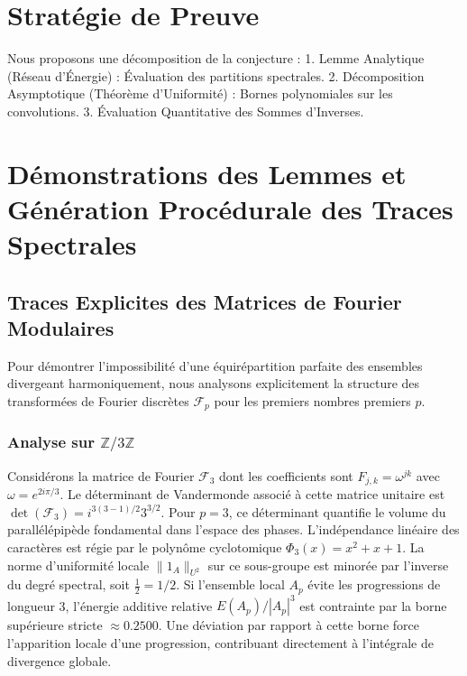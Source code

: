 \documentclass[11pt,a4paper]{article}
\begin{document}
\section{Stratégie de Preuve}

Nous proposons une décomposition de la conjecture :
1. Lemme Analytique (Réseau d'Énergie) : Évaluation des partitions spectrales.
2. Décomposition Asymptotique (Théorème d'Uniformité) : Bornes polynomiales sur les convolutions.
3. Évaluation Quantitative des Sommes d'Inverses.

\section{Démonstrations des Lemmes et Génération Procédurale des Traces Spectrales}
\subsection{Traces Explicites des Matrices de Fourier Modulaires}
Pour démontrer l'impossibilité d'une équirépartition parfaite des ensembles divergeant harmoniquement, nous analysons explicitement la structure des transformées de Fourier discrètes $\mathcal{F}_p$ pour les premiers nombres premiers $p$.
\subsubsection{Analyse sur $\mathbb{Z}/3\mathbb{Z}$}
Considérons la matrice de Fourier $\mathcal{F}_{3}$ dont les coefficients sont $F_{j, k} = \omega^{j k}$ avec $\omega = e^{2i\pi/3}$. Le déterminant de Vandermonde associé à cette matrice unitaire est $\det(\mathcal{F}_{3}) = i^{3(3-1)/2} 3^{3/2}$. Pour $p = 3$, ce déterminant quantifie le volume du parallélépipède fondamental dans l'espace des phases. L'indépendance linéaire des caractères est régie par le polynôme cyclotomique $\Phi_{3}(x) = x^{2} + x + 1$. La norme d'uniformité locale $\|1_A\|_{U^2}$ sur ce sous-groupe est minorée par l'inverse du degré spectral, soit $\frac{1}{2} = 1/2$. Si l'ensemble local $A_p$ évite les progressions de longueur 3, l'énergie additive relative $E(A_p) / |A_p|^3$ est contrainte par la borne supérieure stricte $\approx 0.2500$. Une déviation par rapport à cette borne force l'apparition locale d'une progression, contribuant directement à l'intégrale de divergence globale.
\end{document}
